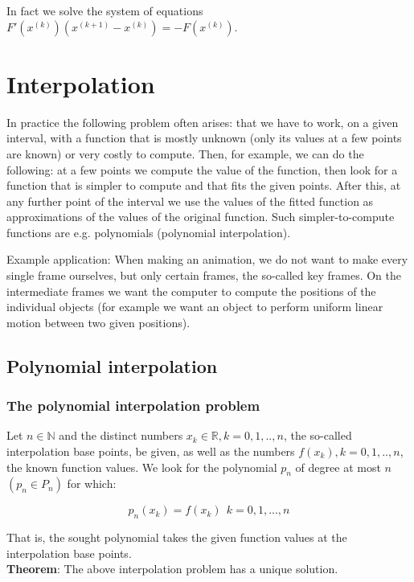 \documentclass[margin=0px]{article}
\begin{document}
\noindent In fact we solve the system of equations $F'(x^{(k)}) (x^{(k+1)} - x^{(k)}) = -F(x^{(k)})$.

\section{Interpolation}

In practice the following problem often arises: that we have to work, on a given interval, with a function
that is mostly unknown (only its values at a few points are known) or very costly to compute.
Then, for example, we can do the following: at a few points we compute the value of the function,
then look for a function that is simpler to compute and that fits
the given points. After this, at any further point of the interval we use the values of the fitted function as
approximations of the values of the original function. Such simpler-to-compute functions are e.g. polynomials (polynomial interpolation).

Example application: When making an animation, we do not want to make every single frame ourselves, but only certain frames,
the so-called key frames. On the intermediate frames we want the computer to compute the positions of the individual objects (for example we want
an object to perform uniform linear motion between two given positions).

\subsection{Polynomial interpolation}

\subsubsection{The polynomial interpolation problem}
Let $n \in \mathbb{N}$ and the distinct numbers $x_{k} \in \mathbb{R}, k=0,1,..,n$, the so-called interpolation base points, be given, as well as
the numbers $f(x_{k}),k=0,1,..,n$, the known function values. We look for the polynomial $p_{n}$ of degree at most $n$ $(p_{n} \in P_{n})$
for which:

\begin{displaymath}
    p_{n}(x_{k}) = f(x_{k}) \ \ k=0,1,...,n
\end{displaymath}

\noindent That is, the sought polynomial takes the given function values at the interpolation base points.\\

\noindent \textbf{Theorem}: The above interpolation problem has a unique solution.\\
\end{document}
